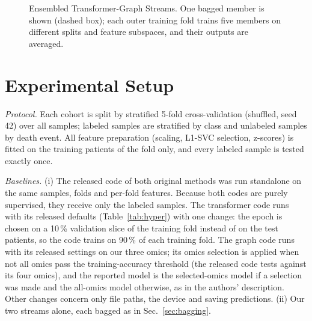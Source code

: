 \documentclass[conference]{IEEEtran}
\begin{document}
\begin{figure}[t]
\caption{Ensembled Transformer-Graph Streams. One bagged member is shown (dashed box); each outer training fold trains five
members on different splits and feature subspaces, and their outputs are averaged.}
\label{fig:arch}
\end{figure}

\section{Experimental Setup}
\emph{Protocol.} Each cohort is split by stratified 5-fold cross-validation (shuffled, seed 42) over all samples; labeled
samples are stratified by class and unlabeled samples by death event. All feature preparation (scaling, L1-SVC
selection, z-scores) is fitted on the training patients of the fold only, and every labeled sample is tested exactly
once.

\emph{Baselines.} (i) The released code of both original methods was run standalone on the same samples, folds and
per-fold features. Because both codes are purely supervised, they receive only the labeled samples. The transformer
code runs with its released defaults (Table~\ref{tab:hyper}) with one change: the epoch is chosen on a 10\,\% validation
slice of the training fold instead of on the test patients, so the code trains on 90\,\% of each training fold. The
graph code runs with its released settings on our three omics; its omics selection is applied when not all omics pass
the training-accuracy threshold (the released code tests against its four omics), and the reported model is the
selected-omics model if a selection was made and the all-omics model otherwise, as in the authors' description. Other
changes concern only file paths, the device and saving predictions. (ii) Our two streams alone, each bagged as in
Sec.~\ref{sec:bagging}.
\end{document}
